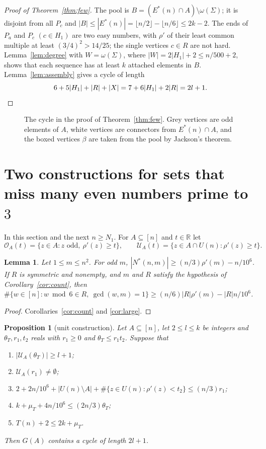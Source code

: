 \documentclass[11pt,a4paper]{article}
\newtheorem{lemma}[theorem]{Lemma}
\newtheorem{proposition}[theorem]{Proposition}
\theoremstyle{definition}
\theoremstyle{remark}
\newcommand{\Es}{E^{*}}
\newcommand{\OA}{\mathcal{O}_A}
\newcommand{\UA}{\mathcal{U}_A}
\begin{document}
\begin{proof}[Proof of Theorem~\ref{thm:few}]
The pool is $B=(\Es(n)\cap A)\setminus\omega(\Sigma)$; it is disjoint from all $P_c$ and
$|B|\le|\Es(n)|=\lfloor n/2\rfloor-\lfloor n/6\rfloor\le2k-2$. The ends of $P_a$ and $P_c$ $(c\in
H_1)$ are two easy numbers, with $\rho'$ of their least common multiple at least $(3/4)^2>14/25$;
the single vertices $c\in R$ are not hard. Lemma~\ref{lem:degree} with $W=\omega(\Sigma)$, where
$|W|=2|H_1|+2\le n/500+2$, shows that each sequence has at least $k$ attached elements in $B$.
Lemma~\ref{lem:assembly} gives a cycle of length
\[
  6+5|H_1|+|R|+|X|=7+6|H_1|+2|R|=2l+1. \qedhere
\]
\end{proof}

\begin{figure}[t]
\centering

\caption{The cycle in the proof of Theorem~\ref{thm:few}. Grey vertices are odd elements of $A$,
white vertices are connectors from $\Es(n)\cap A$, and the boxed vertices $\beta$ are taken from the
pool by Jackson's theorem.}
\label{fig:long}
\end{figure}

\section{\texorpdfstring{Two constructions for sets that miss many even numbers prime to $3$}{Two constructions for sets that miss many even numbers prime to 3}}\label{sec:constructions}

In this section and the next $n\ge N_1$. For $A\subseteq[n]$ and $t\in\mathbb{R}$ let
\[
  \OA(t)=\{z\in A:z\text{ odd},\ \rho'(z)\ge t\},\qquad\UA(t)=\{z\in A\cap U(n):\rho'(z)\ge t\}.
\]

\begin{lemma}\label{lem:countbig}
Let $1\le m\le n^2$. For odd $m$, $|N^*(n,m)|\ge(n/3)\rho'(m)-n/10^6$. If $R$ is symmetric and
nonempty, and $m$ and $R$ satisfy the hypothesis of Corollary~\ref{cor:count}, then
$\#\{w\in[n]:w\bmod6\in R,\ \gcd(w,m)=1\}\ge(n/6)|R|\rho'(m)-|R|n/10^6$.
\end{lemma}

\begin{proof}
Corollaries~\ref{cor:count} and \ref{cor:large}.
\end{proof}

\begin{proposition}[unit construction]\label{prop:unit}
Let $A\subseteq[n]$, let $2\le l\le k$ be integers and $\theta_T,r_1,t_2$ reals with $r_1\ge0$ and
$\theta_T\le r_1t_2$. Suppose that
\begin{enumerate}[label=(T\arabic*), nosep]
\item $|\UA(\theta_T)|\ge l+1$;
\item $\UA(r_1)\neq\emptyset$;
\item $2+2n/10^6+|U(n)\setminus A|+\#\{z\in U(n):\rho'(z)<t_2\}\le(n/3)r_1$;
\item $k+\mu_T+4n/10^6\le(2n/3)\theta_T$;
\item $T(n)+2\le2k+\mu_T$.
\end{enumerate}
Then $G(A)$ contains a cycle of length $2l+1$.
\end{proposition}
\end{document}
